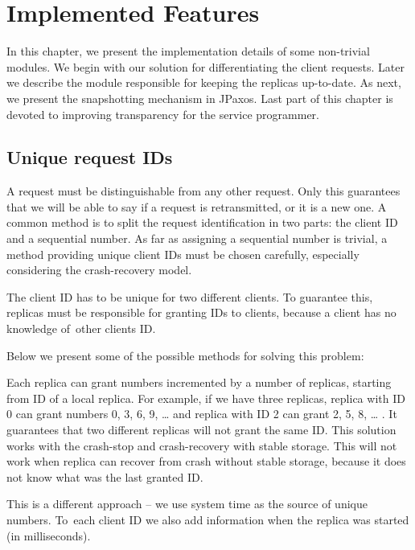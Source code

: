 \chapter{Implemented Features}

In this chapter, we present the implementation details of some non-trivial modules.
We begin with our solution for differentiating the client requests. Later we describe the module responsible for keeping the replicas up-to-date. As next, we present the snapshotting mechanism in JPaxos. Last part of this chapter is devoted to improving transparency for the service programmer.

\section{Unique request IDs}

A request must be distinguishable from any other request. Only this guarantees that we will be able to say if a request is retransmitted, or it is a new one. A common method is to split the request identification in two parts: the client ID and a sequential number. As far as assigning a sequential number is trivial, a method providing unique client IDs must be chosen carefully, especially considering the crash-recovery model.

The client ID has to be unique for two different clients. To guarantee this, replicas must be responsible for granting IDs to clients, because a client has no knowledge of~other clients ID.

Below we present some of the possible methods for solving this problem:

Each replica can grant numbers incremented by a number of replicas, starting from ID of a local replica. For example, if we have three replicas, replica with ID 0 can grant numbers 0, 3, 6, 9, \ldots{} and replica with ID 2 can grant 2, 5, 8, \ldots{} . It guarantees that two different replicas will not grant the same ID. This solution works with the crash-stop and crash-recovery with stable storage. This will not work when replica can recover from crash without stable storage, because it does not know what was the last granted ID.

\clearpage

This is a different approach -- we use system time as the source of unique numbers. To~each client ID we also add information when the replica was started (in milliseconds).

